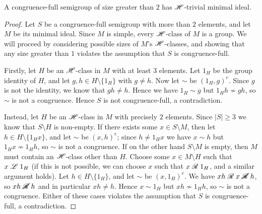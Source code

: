 \begin{lemma}
  \label{lem:m-is-h-trivial}
  A congruence-full semigroup of size greater than $2$ has $\mathrel{\mathscr{H}}$-trivial
  minimal ideal.
  \begin{proof}
    Let $S$ be a congruence-full semigroup with more than $2$ elements, and let
    $M$ be its minimal ideal.  Since $M$ is simple, every $\mathrel{\mathscr{H}}$-class of $M$ is
    a group.  We will proceed by considering possible sizes of $M$'s
    $\mathrel{\mathscr{H}}$-classes, and showing that any size greater than $1$ violates the
    assumption that $S$ is congruence-full.

    Firstly, let $H$ be an $\mathrel{\mathscr{H}}$-class in $M$ with at least $3$ elements.  Let
    $1_H$ be the group identity of $H$, and let $g,h \in H\setminus\{1_H\}$
    with $g \neq h$.  Now let $\sim$ be $(1_H, g)^e$.  Since $g$ is not the
    identity, we know that $gh \neq h$.  Hence we have $1_H \sim g$ but
    $1_H h \nsim gh$, so $\sim$ is not a congruence.  Hence $S$ is not
    congruence-full, a contradiction.

    Instead, let $H$ be an $\mathrel{\mathscr{H}}$-class in $M$ with precisely $2$ elements.
    Since $|S| \geq 3$ we know that $S \setminus H$ is non-empty.  If there
    exists some $x \in S \setminus M$, then let $h \in H \setminus \{1_H x\}$,
    and let $\sim$ be $(x,h)^e$; since $h \neq 1_H x$ we have $x \sim h$ but
    $1_H x \nsim 1_H h$, so $\sim$ is not a congruence.  If on the other hand
    $S \setminus M$ is empty, then $M$ must contain an $\mathrel{\mathscr{H}}$-class other than
    $H$.  Choose some $x \in M \setminus H$ such that $x \mathrel{\mathscr{L}} 1_H$ (if this is
    not possible, we can choose $x$ such that $x \mathrel{\mathscr{R}} 1_H$, and a similar
    argument holds).  Let $h \in H \setminus \{1_H\}$, and let $\sim$ be
    $(x,1_H)^e$.  We have $xh \mathrel{\mathscr{R}} x \mathrel{\cancel{\mathscr{R}}} h$, so $xh \mathrel{\cancel{\mathscr{R}}} h$ and in particular
    $xh \neq h$.  Hence $x \sim 1_H$ but $xh \nsim 1_H h$, so $\sim$ is
    not a congruence.  Either of these cases violates the assumption that $S$
    is congruence-full, a contradiction.
  \end{proof}
\end{lemma}

